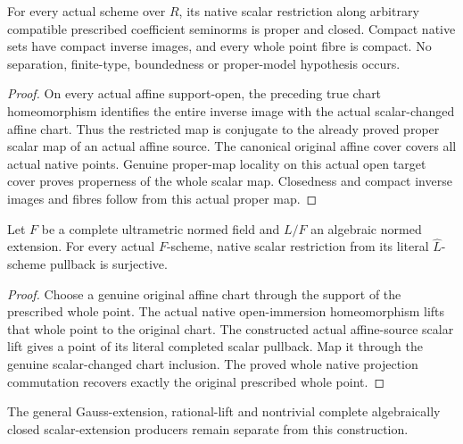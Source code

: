 \begin{lemma}
\label{lem:fc-scheme-scalar-proper}
\leanok
{}
For every actual scheme over $R$, its native scalar restriction along
arbitrary compatible prescribed coefficient seminorms is proper and
closed. Compact native sets have compact inverse images, and every
whole point fibre is compact. No separation, finite-type, boundedness
or proper-model hypothesis occurs.
\end{lemma}
\begin{proof}
On every actual affine support-open, the preceding true chart
homeomorphism identifies the entire inverse image with the actual
scalar-changed affine chart. Thus the restricted map is conjugate to
the already proved proper scalar map of an actual affine source. The
canonical original affine cover covers all actual native points.
Genuine proper-map locality on this actual open target cover proves
properness of the whole scalar map. Closedness and compact inverse
images and fibres follow from this actual proper map.
\end{proof}

\begin{lemma}
\label{lem:fc-scheme-scalar-algebraic-completion-lift}
\leanok
{}
Let $F$ be a complete ultrametric normed field and $L/F$ an algebraic
normed extension. For every actual $F$-scheme, native scalar restriction
from its literal $\widehat L$-scheme pullback is surjective.
\end{lemma}
\begin{proof}
Choose a genuine original affine chart through the support of the
prescribed whole point. The actual native open-immersion homeomorphism
lifts that whole point to the original chart. The constructed actual
affine-source scalar lift gives a point of its literal completed
scalar pullback. Map it through the genuine scalar-changed chart
inclusion. The proved whole native projection commutation recovers
exactly the original prescribed whole point.
\end{proof}

The general Gauss-extension, rational-lift and nontrivial complete
algebraically closed scalar-extension producers remain separate from
this construction.
